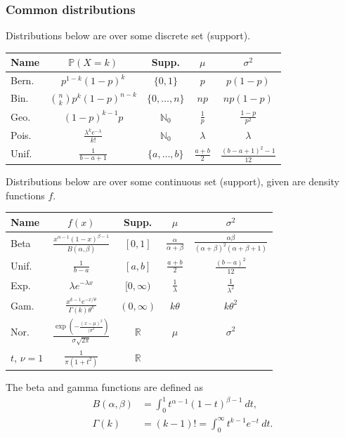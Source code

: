 \subsubsection{Common distributions}
Distributions below are over some discrete set (support).
\begin{table}[H]
    \centering
    \begin{tabular}{|l|c|c|c|c|}
        \hline
        Name & $\mathbb P(X = k)$ & Supp. & $\mu$ & $\sigma^2$ \\
        \hline
        Bern. & $p^{1-k}(1-p)^k$ & $\{0, 1\}$ & $p$ & $p(1 - p)$ \\
        Bin. & $\binom nk p^k(1-p)^{n-k}$ & $\{0, \dots, n\}$ & $np$ & $np(1-p)$ \\
        Geo. & $(1 - p)^{k-1}p$ & $\mathbb N_0$ & $\frac1p$ & $\frac{1-p}{p^2}$ \\
        Pois. & $\frac{\lambda^ke^{-\lambda}}{k!}$ & $\mathbb N_0$ & $\lambda$ & $\lambda$ \\
        Unif. & $\frac1{b-a+1}$ & $\{a, \dots, b\}$ & $\frac{a + b}2$ & $\frac{(b - a + 1)^2 - 1}{12}$ \\
        \hline
    \end{tabular}
    \label{tab:distr_discrete}
\end{table}
Distributions below are over some continuous set (support), given are density functions $f$.
\begin{table}[H]
    \centering
    \begin{tabular}{|l|c|c|c|c|}
        \hline
        Name & $f(x)$ & Supp. & $\mu$ & $\sigma^2$ \\
        \hline
        Beta & $\frac{x^{\alpha-1}(1 - x)^{\beta-1}}{B(\alpha, \beta)}$ & $[0, 1]$ & $\frac\alpha{\alpha+\beta}$ & $\frac{\alpha\beta}{(\alpha+\beta)^2(\alpha+\beta+1)}$ \\
        Unif. & $\frac1{b-a}$ & $[a, b]$ & $\frac{a + b}2$ & $\frac{(b-a)^2}{12}$ \\
        Exp. & $\lambda e^{-\lambda x}$ & $[0, \infty)$ & $\frac1\lambda$ & $\frac1{\lambda^2}$ \\
        Gam. & $\frac{x^{k-1}e^{-x/\theta}}{\Gamma(k)\theta^k}$ & $(0, \infty)$ & $k\theta$ & $k\theta^2$ \\
        Nor. & $\frac{\exp\left(-\frac{(x-\mu)^2}{(\sigma^2}\right)}{\sigma\sqrt{2\pi}}$ & $\mathbb R$ & $\mu$ & $\sigma^2$ \\
        $t$, $\nu = 1$ & $\frac1{\pi(1+t^2)}$ & $\mathbb R$ & & \\
        \hline
    \end{tabular}
    \label{tab:distr_cont}
\end{table}
The beta and gamma functions are defined as
\begin{align*}
    B(\alpha, \beta) &= \int_0^1 t^{\alpha-1}(1-t)^{\beta-1}\ dt, \\
    \Gamma(k) &= (k - 1)! = \int_0^\infty t^{k-1}e^{-t}\ dt.
\end{align*}

